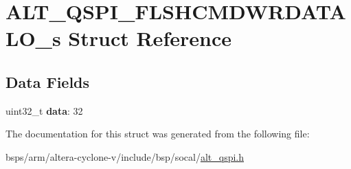 \hypertarget{structALT__QSPI__FLSHCMDWRDATALO__s}{}\section{A\+L\+T\+\_\+\+Q\+S\+P\+I\+\_\+\+F\+L\+S\+H\+C\+M\+D\+W\+R\+D\+A\+T\+A\+L\+O\+\_\+s Struct Reference}
\label{structALT__QSPI__FLSHCMDWRDATALO__s}
\subsection*{Data Fields}
\begin{DoxyCompactItemize}
\item 
\mbox{\label{structALT__QSPI__FLSHCMDWRDATALO__s_a0d1508ba369a8d45189c3557f6cae1e6}} 
uint32\+\_\+t {\bfseries data}\+: 32
\end{DoxyCompactItemize}


The documentation for this struct was generated from the following file\+:\begin{DoxyCompactItemize}
\item 
bsps/arm/altera-\/cyclone-\/v/include/bsp/socal/\mbox{\hyperlink{include_2bsp_2socal_2alt__qspi_8h}{alt\+\_\+qspi.\+h}}\end{DoxyCompactItemize}
